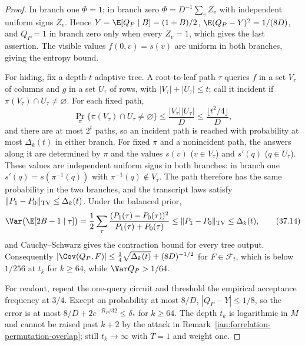 \begin{proof}
In branch one \(\Phi=1\); in branch zero \(\Phi=D^{-1}\sum_vZ_v\) with independent uniform signs \(Z_v\). Hence \(Y=\E[Q_P\mid B]=(1+B)/2\), \(\E(Q_P-Y)^2=1/(8D)\), and \(Q_P=1\) in branch zero only when every \(Z_v=1\), which gives the last assertion. The visible values \(f(0,v)=s(v)\) are uniform in both branches, giving the entropy bound.

For hiding, fix a depth-\(t\) adaptive tree. A root-to-leaf path \(\tau\) queries \(f\) in a set \(V_\tau\) of columns and \(g\) in a set \(U_\tau\) of rows, with \(|V_\tau|+|U_\tau|\le t\); call it incident if \(\pi(V_\tau)\cap U_\tau\ne\varnothing\). For each fixed path,
\[
 \Pr_\pi\{\pi(V_\tau)\cap U_\tau\ne\varnothing\}\le\frac{|V_\tau||U_\tau|}{D}\le\frac{\lfloor t^2/4\rfloor}{D},
 \tag{37.13}
\]
and there are at most \(2^t\) paths, so an incident path is reached with probability at most \(\Delta_k(t)\) in either branch. For fixed \(\pi\) and a nonincident path, the answers along it are determined by \(\pi\) and the values \(s(v)\) (\(v\in V_\tau\)) and \(s'(q)\) (\(q\in U_\tau\)). These values are independent uniform signs in both branches: in branch one \(s'(q)=s(\pi^{-1}(q))\) with \(\pi^{-1}(q)\notin V_\tau\). The path therefore has the same probability in the two branches, and the transcript laws satisfy \(\|P_1-P_0\|_{\rm TV}\le\Delta_k(t)\). Under the balanced prior,
\[
 \Var\bigl(\E[2B-1\mid\tau]\bigr)=\frac12\sum_\tau\frac{(P_1(\tau)-P_0(\tau))^2}{P_1(\tau)+P_0(\tau)}\le\|P_1-P_0\|_{\rm TV}\le\Delta_k(t),
 \tag{37.14}
\]
and Cauchy--Schwarz gives the contraction bound for every tree output. Consequently \(|\Cov(Q_P,F)|\le\frac14\sqrt{\Delta_k(t)}+(8D)^{-1/2}\) for \(F\in\mathcal F_t\), which is below \(1/256\) at \(t_k\) for \(k\ge64\), while \(\Var Q_P>1/64\).

For readout, repeat the one-query circuit and threshold the empirical acceptance frequency at \(3/4\). Except on probability at most \(8/D\), \(|Q_P-Y|\le1/8\), so the error is at most \(8/D+2e^{-R_P/32}\le\delta_*\) for \(k\ge64\). The depth \(t_k\) is logarithmic in \(M\) and cannot be raised past \(k+2\) by the attack in Remark~\ref{ian:forrelation-permutation-overlap}; still \(t_k\to\infty\) with \(T=1\) and weight one.
\end{proof}

